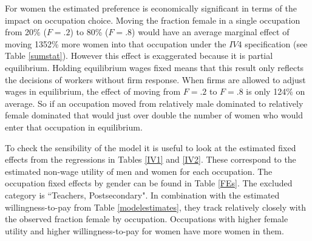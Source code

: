 \documentclass[11pt]{article}
\begin{document}




For women the estimated preference is economically significant in terms of the impact on occupation choice. Moving the fraction female in a single occupation from 20\% ($F=.2$) to 80\% ($F=.8$) would have an average marginal effect of moving 1352\% more women into that occupation under the $IV4$ specification (see Table \ref{sumstat}). However this effect is exaggerated because it is partial equilibrium. Holding equilibrium wages fixed means that this result only reflects the decisions of workers without firm response. When firms are allowed to adjust wages in equilibrium, the effect of moving from $F=.2$ to $F=.8$ is only 124\% on average. So if an occupation moved from relatively male dominated to relatively female dominated that would just over double the number of women who would enter that occupation in equilibrium.



To check the sensibility of the model it is useful to look at the estimated fixed effects from the regressions in Tables \ref{IV1} and \ref{IV2}. These correspond to the estimated non-wage utility of men and women for each occupation. The occupation fixed effects by gender can be found in Table \ref{FEs}. The excluded category is ``Teachers, Postsecondary". In combination with the estimated willingness-to-pay from Table \ref{modelestimates}, they track relatively closely with the observed fraction female by occupation. Occupations with higher female utility and higher willingness-to-pay for women have more women in them. 
\end{document}
